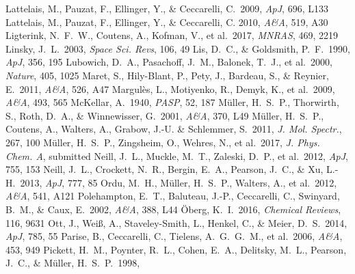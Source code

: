 \documentclass{iau}
\begin{document}
\begin{thebibliography}{}
 Lattelais, M., Pauzat, F., 
Ellinger, Y., \& Ceccarelli, C.\ 2009, \textit{ApJ}, 696, L133 
 Lattelais, M., Pauzat, F., 
Ellinger, Y., \& Ceccarelli, C. 2010, \textit{A\&A}, 519, A30
 Ligterink, N.~F.~W., 
Coutens, A., Kofman, V., et al.\ 2017, \textit{MNRAS}, 469, 2219 
 Linsky, J.~L.\ 2003, 
\textit{Space Sci. Revs}, 106, 49
 Lis, D.~C., \& Goldsmith, P.~F.\ 1990, 
\textit{ApJ}, 356, 195
 Lubowich, D.~A., Pasachoff, J.~M., 
Balonek, T.~J., et al.\ 2000, \textit{Nature}, 405, 1025 
 Maret, S., Hily-Blant, P., Pety, J., 
Bardeau, S., \& Reynier, E.\ 2011, \textit{A\&A}, 526, A47
 Margul{\`e}s, L., 
Motiyenko, R., Demyk, K., et al.\ 2009, \textit{A\&A}, 493, 565 
 McKellar, A.\ 1940, \textit{PASP}, 52, 187
 M{\"u}ller, H.~S.~P., Thorwirth, 
S., Roth, D.~A., \& Winnewisser, G.\ 2001, \textit{A\&A}, 370, L49
 M{\"u}ller, H.~S.~P., Coutens, A., 
Walters, A., Grabow, J.-U. \& Schlemmer, S.\ 2011, \textit{J. Mol. Spectr.}, 
267, 100 
 M{\"u}ller, H.~S.~P., Zingsheim, 
O., Wehres, N., et al.\ 2017, \textit{J. Phys. Chem. A}, submitted
 Neill, J.~L., Muckle, M.~T., 
Zaleski, D.~P., et al.\ 2012, \textit{ApJ}, 755, 153 
 Neill, J.~L., Crockett, N.~R., 
Bergin, E.~A., Pearson, J.~C., \& Xu, L.-H.\ 2013, \textit{ApJ}, 777, 85
 Ordu, M.~H., M{\"u}ller, H.~S.~P., 
Walters, A., et al.\ 2012, \textit{A\&A}, 541, A121
 Polehampton, E.~T., 
Baluteau, J.-P., Ceccarelli, C., Swinyard, B.~M., \& Caux, E.\ 2002, 
\textit{A\&A}, 388, L44 
 \"Oberg, K.~I.\ 2016, 
\textit{Chemical Reviews}, 116, 9631
 Ott, J., Wei{\ss}, A., 
Staveley-Smith, L., Henkel, C., \& Meier, D.~S.\ 2014, \textit{ApJ}, 785, 55
 Parise, B., Ceccarelli, C., 
Tielens, A.~G.~G.~M., et al.\ 2006, \textit{A\&A}, 453, 949 
 Pickett, H.~M., Poynter, R.~L., 
Cohen, E.~A., Delitsky, M.~L., Pearson, J.~C., \& M{\"u}ller, H.~S.~P.\ 1998, 

\end{thebibliography}
\end{document}
